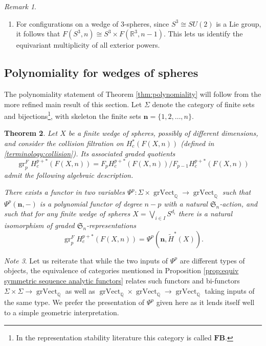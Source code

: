 \documentclass[12pt]{article}
\newcommand{\Q}{\mathbb{Q}}
\newcommand{\R}{\mathbb{R}}
\newcommand{\SymGroup}[1][n]{\mathfrak{S}_{#1}}
\newcommand{\n}[1][n]{\mathbf{#1}}
\DeclareMathOperator{\gr}{gr}
\DeclareMathOperator{\GradedVect}{grVect}
\theoremstyle{plain}
\newtheorem{thm}{Theorem}[section]
\theoremstyle{definition}
\theoremstyle{remark}
\newtheorem{rmk}[thm]{Remark}
\newtheorem{note}[thm]{Note}
\begin{document}
\begin{rmk}
\begin{enumerate}
    \item For configurations on a wedge of $3$-spheres, since $S^3\cong SU(2)$ is a Lie group, it follows that $F(S^3,n) \cong S^3 \times F(\R^3,n-1)$. This lets us identify the equivariant multiplicity of all exterior powers. %
\end{enumerate}

\end{rmk}


\subsection{Polynomiality for wedges of spheres}

The polynomiality statement of Theorem \ref{thm:polynomiality} will follow from the more refined main result of this section. Let $\Sigma$ denote the category of finite sets and bijections\footnote{In the representation stability literature this category is called $\textbf{FB}$.}, with skeleton the finite sets $\n = \{1,2,\ldots, n\}$.

\begin{thm}\label{thm:graded polynomiality}
    Let $X$ be a finite wedge of spheres, possibly of different dimensions, and consider the collision filtration on $H_c^*(F(X, n))$ (defined in \ref{terminology:collision}). Its associated graded quotients
    \[
        \gr_p^F H_c^{p+*}(F(X, n)) = F_p H_c^{p+*}(F(X, n))/F_{p-1} H_c^{p+*}(F(X, n))
    \]
    admit the following algebraic description.
    
    There exists a functor in two variables $\Psi^p\colon \Sigma \times \GradedVect_{\Q} \to \GradedVect_{\Q}$ such that $\Psi^p(\n,-)$ is a polynomial functor of degree $n-p$
    with a natural $\SymGroup$-action, and such that for any finite wedge of spheres $X = \bigvee_{i\in I}{S^{d_i}}$ there is a natural isomorphism of graded $\SymGroup$-representations
    \[
        \gr_p^F H_c^{p+\ast}(F(X, n)) = \Psi^p(\n,\tilde{H}^*(X)).
    \]
\end{thm}

\begin{note}
Let us reiterate that while the two inputs of $\Psi^p$ are different types of objects, the equivalence of categories mentioned in Proposition \ref{prop:equiv symmetric sequence analytic functors} relates such functors and bi-functors $\Sigma\times\Sigma \to \GradedVect_\Q$ as well as $\GradedVect_\Q\times \GradedVect_\Q \to \GradedVect_\Q$ taking inputs of the same type. We prefer the presentation of $\Psi^p$ given here as it lends itself well to a simple geometric interpretation.
\end{note}
\end{document}
